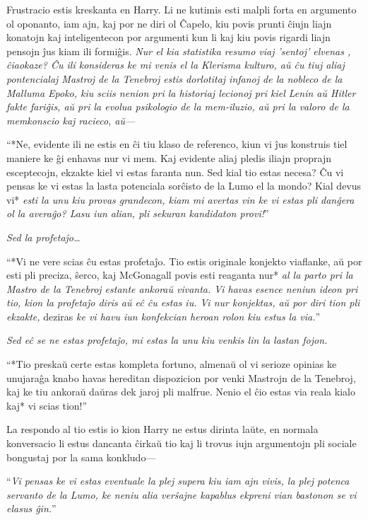 Frustracio estis kreskanta en Harry. Li ne kutimis esti malpli forta
en argumento ol oponanto, iam ajn, kaj por ne diri ol Ĉapelo, kiu
povis prunti ĉiujn liajn konatojn kaj inteligentecon por argumenti kun
li kaj kiu povis rigardi liajn pensojn ĵus kiam ili
formiĝis. \emph{Nur el kia statistika resumo viaj 'sentoj' elvenas ,
  ĉiaokaze? Ĉu ili konsideras ke mi venis el la Klerisma kulturo, aŭ
  ĉu tiuj aliaj pontencialaj Mastroj de la Tenebroj estis dorlotitaj
  infanoj de la nobleco de la Malluma Epoko, kiu sciis nenion pri la
  historiaj lecionoj pri kiel Lenin aŭ Hitler fakte fariĝis, aŭ pri la
  evolua psikologio de la mem-iluzio, aŭ pri la valoro de la
  memkonscio kaj racieco, aŭ—}

``*Ne, evidente ili ne estis en ĉi tiu klaso de referenco, kiun vi ĵus
konstruis tiel maniere ke ĝi enhavas nur vi mem. Kaj evidente aliaj
pledis iliajn proprajn esceptecojn, ekzakte kiel vi estas faranta
nun. Sed kial tio estas necesa? Ĉu vi pensas ke vi estas la lasta
potenciala sorĉisto de la Lumo el la mondo? Kial devus vi* \emph{esti
  la unu kiu provas grandecon, kiam mi avertas vin ke vi estas pli
  danĝera ol la averaĝo? Lasu iun alian, pli sekuran kandidaton
  provi!}''

\emph{Sed la profetaĵo\ldots}

``*Vi ne vere scias ĉu estas profetaĵo. Tio estis originale konjekto
viaflanke, aŭ por esti pli preciza, ŝerco, kaj McGonagall povis esti
reaganta nur* \emph{al la parto pri la Mastro de la Tenebroj estante
  ankoraŭ vivanta. Vi havas esence neniun ideon pri tio, kion la
  profetaĵo diris aŭ eĉ ĉu estas iu. Vi nur konjektas, aŭ por diri
  tion pli ekzakte,} deziras \emph{ke vi havu iun konfekcian heroan
  rolon kiu estus la via.}''

\emph{Sed eĉ se ne estas profetaĵo, mi estas la unu kiu venkis lin la
  lastan fojon.}

``*Tio preskaŭ certe estas kompleta fortuno, almenaŭ ol vi serioze
opinias ke unujaraĝa knabo havas hereditan dispozicion por venki
Mastrojn de la Tenebroj, kaj ke tiu ankoraŭ daŭras dek jaroj pli
malfrue. Nenio el ĉio estas via reala kialo kaj* vi scias tion!''

La respondo al tio estis io kion Harry ne estus dirinta laŭte, en
normala konversacio li estus dancanta ĉirkaŭ tio kaj li trovus iujn
argumentojn pli sociale bongustaj por la sama konkludo—

``\emph{Vi pensas ke vi estas eventuale la plej supera kiu iam ajn
  vivis, la plej potenca servanto de la Lumo, ke neniu alia verŝajne
  kapablus ekpreni vian bastonon se vi elasus ĝin.}''

